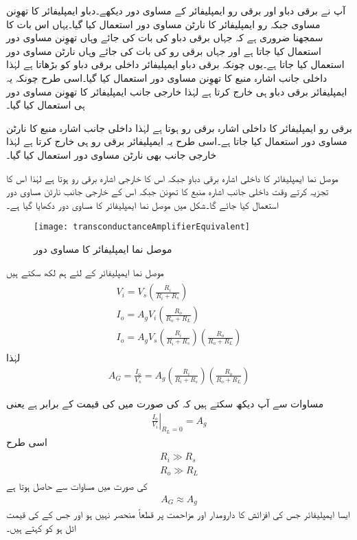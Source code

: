 آپ نے برقی دباو اور برقی رو ایمپلیفائر کے مساوی دور دیکھے۔دباو ایمپلیفائر کا تھوِنن  مساوی جبکہ رو ایمپلیفائر کا نارٹن مساوی دور استعمال کیا گیا۔یہاں اس بات کا سمجھنا ضروری ہے کہ جہاں برقی دباو کی بات کی جائے وہاں تھوِنن  مساوی دور استعمال کیا جاتا ہے اور جہاں برقی رو کی بات کی جائے وہاں نارٹن مساوی دور استعمال کیا جاتا ہے۔یوں چونکہ برقی دباو ایمپلیفائر داخلی برقی دباو کو بڑھاتا ہے لہٰذا داخلی جانب اشارہ منبع کا تھوِنن  مساوی دور استعمال کیا گیا۔اسی طرح چونکہ یہ ایمپلیفائر برقی دباو ہی خارج کرتا ہے لہٰذا خارجی جانب ایمپلیفائر کا تھوِنن  مساوی دور ہی استعمال کیا گیا۔

برقی رو ایمپلیفائر کا داخلی اشارہ برقی رو ہوتا ہے لہٰذا داخلی جانب اشارہ منبع کا نارٹن مساوی دور استعمال کیا جاتا ہے۔اسی طرح یہ ایمپلیفائر برقی رو ہی خارج کرتا ہے لہٰذا خارجی جانب بھی نارٹن مساوی دور استعمال کیا گیا۔

موصل نما ایمپلیفائر کا داخلی اشارہ برقی دباو جبکہ اس کا خارجی اشارہ برقی رو ہوتا ہے لہٰذا اس کا تجزیہ کرتے وقت داخلی جانب اشارہ منبع کا تھوِنن  جبکہ اس کے خارجی جانب نارٹن مساوی دور استعمال کیا جائے گا۔شکل  میں موصل نما ایمپلیفائر کا مساوی دور دکھایا گیا ہے۔
\begin{figure}
\centering
\texttt{[image: transconductanceAmplifierEquivalent]}
\caption{موصل نما ایمپلیفائر کا مساوی دور}
\label{شکل_واپسی_موصلیت_نما_ایمپلیفائر_کا_مساوی_دور}
\end{figure}
موصل نما ایمپلیفائر کے لئے ہم لکھ سکتے ہیں
\begin{gather} \label{مساوات_واپسی_موصلیت_نما_خارجی_رو}
\begin{aligned}
V_i = V_s \left(\frac{R_i}{R_i+R_s}\right)\\
I_o=A_g V_i \left(\frac{R_o}{R_o+R_L}\right) \\
I_o = A_g V_s  \left (\frac{R_i}{R_i+R_s} \right ) \left(\frac{R_o}{R_o+R_L} \right )
\end{aligned}
\end{gather}
لہٰذا
\begin{align} \label{مساوات_واپسی_کل_موصلیت_نما}
A_G=\frac{I_o}{V_s}=A_g \left (\frac{R_i}{R_i+R_s} \right ) \left(\frac{R_o}{R_o+R_L} \right )
\end{align}

مساوات  سے آپ دیکھ سکتے ہیں کہ  کی صورت میں  کی قیمت  کے برابر ہے یعنی 
\begin{align}
\left.  \frac{I_o}{V_i} \right |_{R_L =0} =A_g
\end{align}
اسی طرح 
\begin{gather}
\begin{aligned}
R_i \gg R_s \\
R_o \gg R_L
\end{aligned}
\end{gather}
 کی صورت میں مساوات   سے حاصل ہوتا ہے
\begin{align}
A_G \approx A_g
\end{align}
ایسا ایمپلیفائر جس کی افزائش  کا دارومدار  اور مزاحمت  پر قطعاً منحصر نہیں ہو اور جس کے  کی قیمت اٹل ہو کو  کہتے ہیں۔

